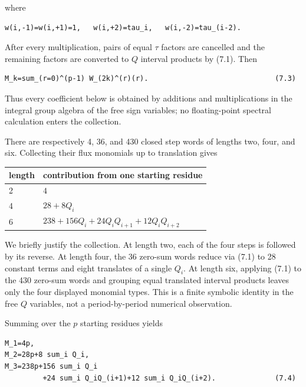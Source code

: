 where

\begin{lstlisting}[language={}]
w(i,-1)=w(i,+1)=1,   w(i,+2)=tau_i,   w(i,-2)=tau_(i-2).
\end{lstlisting}

After every multiplication, pairs of equal \(\tau\) factors are cancelled and
the remaining factors are converted to \(Q\) interval products by (7.1). Then

\begin{lstlisting}[language={}]
M_k=sum_(r=0)^(p-1) W_(2k)^(r)(r).                              (7.3)
\end{lstlisting}

Thus every coefficient below is obtained by additions and multiplications in
the integral group algebra of the free sign variables; no floating-point
spectral calculation enters the collection.

There are respectively 4, 36, and 430 closed step words of lengths two, four,
and six. Collecting their flux monomials up to translation gives

\begin{center}
\begin{tabular}{ll}
\toprule
length & contribution from one starting residue \\
\midrule
2 & \(4\) \\
4 & \(28+8Q_i\) \\
6 & \(238+156Q_i+24Q_iQ_{i+1}+12Q_iQ_{i+2}\) \\
\bottomrule
\end{tabular}%
\end{center}

We briefly justify the collection. At length two, each of the four steps is
followed by its reverse. At length four, the 36 zero-sum words reduce via
(7.1) to 28 constant terms and eight translates of a single \(Q_i\). At length
six, applying (7.1) to the 430 zero-sum words and grouping equal translated
interval products leaves only the four displayed monomial types. This is a
finite symbolic identity in the free \(Q\) variables, not a period-by-period
numerical observation.

Summing over the \(p\) starting residues yields

\begin{lstlisting}[language={}]
M_1=4p,
M_2=28p+8 sum_i Q_i,
M_3=238p+156 sum_i Q_i
         +24 sum_i Q_iQ_(i+1)+12 sum_i Q_iQ_(i+2).              (7.4)
\end{lstlisting}

